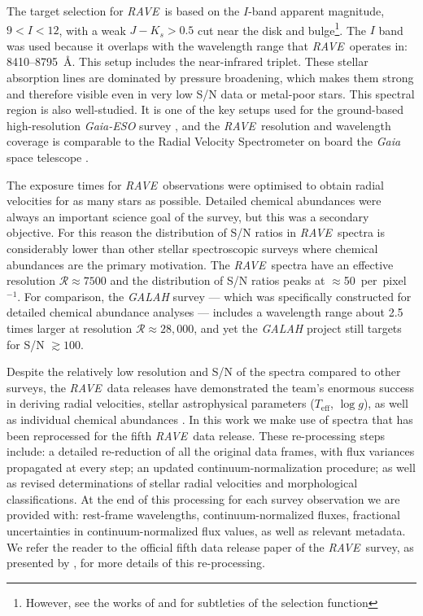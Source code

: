 \documentclass[preprint,trackchanges]{aastex}
\newcommand{\project}[1]{\textsl{#1}}
\newcommand{\acronym}[1]{{\small{#1}}}
\newcommand{\rave}{\project{\acronym{RAVE}}}
\newcommand{\logg}{\log g}
\newcommand{\teff}{T_{\mathrm{eff}}}
\begin{document}
The target selection for \rave\ is based on the $I$-band apparent magnitude,
$9 < I < 12$, with a weak $J - K_s > 0.5$ cut near the disk and bulge\footnote{
However, see the works of \citet{Kunder_2016} and \citet{Kordopatis_2013} for 
subtleties of the selection function}.
The $I$ band was used because it overlaps with the wavelength range 
that \rave\ operates in:  8410--8795~\AA.  This setup includes the  
near-infrared triplet.  These stellar absorption lines are dominated by pressure 
broadening, which makes them strong and therefore visible even in very low S/N data
or metal-poor stars.  This spectral region is also well-studied.  It is one of the
key setups used for the ground-based high-resolution \project{Gaia-ESO} survey
\citep{Gilmore_2012,Randich_2013}, and the \rave\ resolution and wavelength
coverage is comparable to the Radial Velocity Spectrometer on board the \project{Gaia}
space telescope \citep{Recio-Blanco_2016}.


The exposure times for \rave\ observations were optimised to obtain radial 
velocities for as many stars as possible.  Detailed chemical abundances were
always an important science goal of the survey, but this was a secondary objective.  
For this reason the distribution of S/N ratios in \rave\ spectra is considerably 
lower than other stellar spectroscopic surveys where chemical abundances are the 
primary motivation.  The \rave\ spectra have an effective resolution 
$\mathcal{R} \approx 7500$ and the distribution of S/N ratios peaks at 
$\approx$50~per~pixel$^{-1}$.  For comparison, the \project{GALAH} survey 
\citep{DeSilva_2015} --- which was specifically constructed for detailed chemical 
abundance analyses --- includes a wavelength range about 2.5 times larger at 
resolution $\mathcal{R} \approx 28,000$, and yet the \project{GALAH} project still 
targets for S/N $\gtrsim100$.


Despite the relatively low resolution and S/N of the spectra compared to other
surveys, the \rave\ data releases have demonstrated the team's enormous success 
in deriving radial velocities, stellar astrophysical parameters ($\teff$, $\logg$),
as well as individual chemical abundances \citep{Steinmetz_2006,Zwitter_2008,
Siebert_2011,Kordopatis_2013, Kunder_2016}.  In this work we make use of spectra
that has been reprocessed for the fifth \rave\ data release.  These re-processing
steps include: a detailed re-reduction of all the original data frames, with flux
variances propagated at every step; an updated continuum-normalization procedure;
as well as revised determinations of stellar radial velocities and morphological
classifications. At the end of this processing for each survey observation we are 
provided with: rest-frame wavelengths, continuum-normalized fluxes, fractional 
uncertainties in continuum-normalized flux values, as well as relevant metadata.  
We refer the reader to the official fifth data release paper of the \rave\ survey, 
as presented by \citet{Kunder_2016}, for more details of this re-processing.
\end{document}
